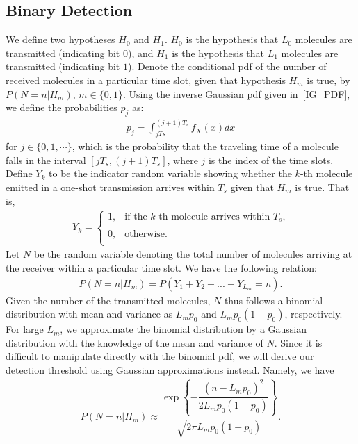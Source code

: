 \subsection{Binary Detection}
 We define two hypotheses $H_0$ and $H_1$. $H_0$ is the hypothesis that $L_0$ molecules are transmitted (indicating bit $0$), and $H_1$ is the hypothesis that $L_1$ molecules are transmitted
 (indicating bit $1$).
 Denote the conditional pdf of the number of received molecules in a particular time slot, given that hypothesis $H_m$ is true, by $P(N=n | H_m)$, $m\in\{0,1\}$.
Using the inverse Gaussian pdf given in~\eqref{IG_PDF}, we define
the probabilities $p_j$ as:
\begin{eqnarray}
p_j = \int^{(j+1)T_s}_{j Ts} f_X(x)dx
\end{eqnarray}
for $j\in \{0,1,\cdots\}$, which is the probability that the traveling time of a molecule falls in the interval $[j T_s,(j+1)T_s]$,
where $j$ is the index of the time slots.
Define $Y_k$ to be the indicator random variable showing whether the $k$-th molecule emitted in a one-shot transmission arrives within $T_s$ given that $H_m$ is true. That is,
\begin{eqnarray}
Y_k = \left\{\begin{array}{ll}
                 1, & \mbox{if the $k$-th molecule arrives within $T_s$,} \\
                 \\
                 0, & \mbox{otherwise.} \\
                \end{array} \right.
\end{eqnarray}
Let $N$ be the random variable denoting the total number of molecules arriving at the receiver within a particular time slot. We have the following relation:
\begin{eqnarray}
P(N=n| H_m)=P(Y_1+Y_2+...+Y_{L_m}=n).
\end{eqnarray}
Given the number of the transmitted molecules, $N$ thus follows a binomial distribution with mean and variance as $L_m p_0$ and $L_m p_0(1-p_0)$, respectively. For large $L_m$, we approximate the binomial distribution by a Gaussian distribution with the knowledge of the mean and variance of $N$. Since it is difficult to manipulate directly with the binomial pdf, we will derive our detection threshold using Gaussian approximations instead.
Namely, we have
\begin{eqnarray}
P(N=n| H_m) \approx \dfrac{\exp
\left\{-\dfrac{(n-L_m p_0)^2}{2 L_m p_0(1-p_0)}\right\}}{\sqrt{2\pi L_m p_0(1-p_0)}}.
\end{eqnarray}
